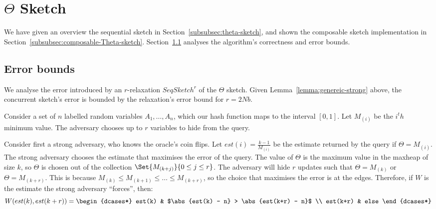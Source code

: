 \section{$\Theta$ Sketch}
\label{sec:theta}


We have given an overview the sequential sketch in Section~\ref{subsubsec:theta-sketch}, 
and shown the composable sketch implementation in Section~\ref{subsubsec:composable-Theta-sketch}.
Section~\ref{ssec:theta-analysis} analyses the algorithm's correctness and error bounds.

\subsection{Error bounds}
\label{ssec:theta-analysis}
We analyse the error introduced by an $r$-relaxation $SeqSketch^r$ of the $\Theta$ sketch.
Given Lemma~\ref{lemma:genereic-strong} above, the concurrent sketch's error is bounded
by the relaxation's error bound for $r=2N$$b$.

Consider a set of $n$ labelled random variables $A_1,\dots,A_n$, which our hash function
maps to the interval $[0,1]$. Let $M_{(i)}$ be the $i^th$ minimum value. The adversary
chooses up to $r$ variables to hide from the query.

Consider first a strong adversary, who knows the oracle's coin flips. Let $est(i)=\frac{k-1}{M_{(i)}}$
be the estimate returned by the query if $\Theta = M_{(i)}$. The strong adversary chooses the
estimate that maximises the error of the query. The value of $\Theta$ is the maximum value in the maxheap
of size $k$, so $\Theta$ is chosen out of the collection $\Set{M_{(k+j)}}{0 \leq j \leq r}$.
The adversary will hide $r$ updates such that $\Theta = M_{(k)}$ or $\Theta = M_{(k+r)}$. This is because
$M_{(k)} \leq M_{(k+1)} \leq \dots \leq M_{(k+r)}$, so the choice that maximises the error is at the edges.
Therefore, if $W$ is the estimate the strong adversary ``forces'', then:
\[
W(est(k), est(k+r)) = \begin{dcases*}
    est(k) & $\abs{est(k) - n} > \abs{est(k+r) - n}$ \\
    est(k+r) & else
    \end{dcases*}
\]

